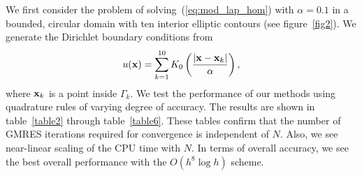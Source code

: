 \documentclass[preprint,12pt]{elsarticle}
\newcommand{\x}{{\bf x}}
\newcommand{\eqr}[1]{~(\ref{#1})}
\newcommand{\figr}[1]{figure~\ref{#1}}
\newcommand{\tabr}[1]{table~\ref{#1}}
\begin{document}
 We first consider the problem of solving\eqr{eq:mod_lap_hom} with $\alpha=0.1$ in a bounded, circular domain with ten interior elliptic contours (see \figr{fig2}). 
We generate the Dirichlet boundary conditions from
\begin{equation}
   u(\x) = \sum_{k=1}^{10}K_0 \left( \frac{|\x - \x_k |}{\alpha} \right),
   \label{exact_sol}
\end{equation}
where $\x_k$ is a point inside $\Gamma_k$.
We test the performance of our methods using quadrature rules of varying degree of accuracy. 
The results are shown in \tabr{table2} through \tabr{table6}. 
These tables confirm that the number of GMRES iterations required for convergence is independent of $N$. 
Also, we see near-linear scaling of the CPU time with $N$. 
In terms of overall accuracy, we see the best overall performance with the $O(h^8 \log h)$ scheme.
\end{document}
